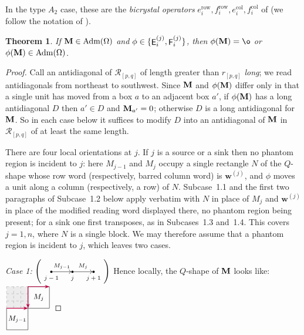 \documentclass[12pt]{amsart}
\newcommand{\bs}{\boldsymbol}
\DeclareMathOperator{\Std}{\operatorname{Adm}}
\DeclareMathOperator{\mate}{\sf E}
\DeclareMathOperator{\matf}{\sf F}
\newcommand{\cell}{.28}
\newcommand{\phantomtile}[5]{%
\begin{scope}[shift={(#1,#2)}]
  \fill[gray!15] (0,0) rectangle ({#3*\cell},{#4*\cell});
  \draw[gray!70, dashed, step=\cell] (0,0) grid ({#3*\cell},{#4*\cell});
  #5
\end{scope}
}
\newtheorem{theorem}{Theorem}[section]
\theoremstyle{definition}
\theoremstyle{remark}
\begin{document}
In the type $A_2$ case, these are the \emph{bicrystal operators} $e_i^{\operatorname{row}}, f_i^{\operatorname{row}},
e_i^{\operatorname{col}}, f_i^{\operatorname{col}}$ of
\cite{Danilov, van} (we follow the notation of \cite{AAA}).

\begin{theorem}\label{thm:S6.3}
If ${\bf M}\in\Std(\Omega)$ and
$\phi\in\{\mate_i^{(j)},\matf_i^{(j)}\}$, then $\phi({\bf M})=\o$ or $\phi({\bf M})\in \operatorname{Adm}(\Omega)$.
\end{theorem}
\begin{proof}
Call an antidiagonal of ${\mathcal R}_{[p,q]}$ of length greater than $r_{[p,q]}$
\emph{long}; we read antidiagonals from northeast to southwest. Since ${\bf M}$ and
$\phi({\bf M})$ differ only in that a single unit has moved from a box $a$ to an adjacent
box $a'$, if $\phi({\bf M})$ has a long antidiagonal $D$ then $a'\in D$ and
${\bf M}_{a'}=0$; otherwise $D$ is a long antidiagonal for ${\bf M}$. So in each case below it suffices to
modify $D$ into an antidiagonal of ${\bf M}$ in ${\mathcal R}_{[p,q]}$ of at least the same
length.

There are four local orientations at $j$. If $j$ is a source or a sink then no phantom
region is incident to $j$: here $M_{j-1}$ and $M_j$ occupy a single rectangle $N$ of the
$Q$-shape whose row word (respectively, barred column word) is ${\bs w}^{(j)}$, and $\phi$
moves a unit along a column (respectively, a row) of $N$. Subcase~1.1 and the first two
paragraphs of Subcase~1.2 below apply verbatim with $N$ in place of $M_j$ and ${\bs w}^{(j)}$ in place of the modified reading word displayed there, no phantom region being present;
for a sink one first transposes, as in Subcases~1.3 and~1.4. This
covers $j=1,n$, where $N$ is a single block. We may therefore assume that a phantom region
is incident to $j$, which leaves two cases.

\noindent\emph{Case 1:} $\left(
\begin{tikzpicture}[baseline=-0.5ex]
\node[circle,fill,inner sep=1pt,label=below:{\scriptsize $j-1$}] (a) at (0,0) {};
\node[circle,fill,inner sep=1pt,label=below:{\scriptsize $j$}]   (b) at (.9,0) {};
\node[circle,fill,inner sep=1pt,label=below:{\scriptsize $j+1$}] (c) at (1.8,0) {};
\draw[->] (a) -- node[above,font=\scriptsize] {$M_{j-1}$} (b);
\draw[->] (b) -- node[above,font=\scriptsize] {$M_j$} (c);
\end{tikzpicture}\right)$ Hence locally, the $Q$-shape of ${\bf M}$ looks like:
$\vcenter{\hbox{\begin{tikzpicture}[scale=1.1, baseline=-.5ex]
\draw (0,0) rectangle (.84,.84);
\node at (.42,.42) {\small{$M_{j-1}$}};
{\phantomtile{0}{.84}{3}{3}{}}
\draw (.84,.84) rectangle (1.68,1.68);
\node at (1.26,1.26) {\small{$M_j$}};
\draw[purple, -{Stealth[length=2mm,width=1.5mm]}, thick] (0,.84) -- (.84,.84);
\draw[purple, -{Stealth[length=2mm,width=1.5mm]}, thick] (.84,1.68) -- (.84,.84);
\draw[purple, -{Stealth[length=2mm,width=1.5mm]}, thick] (.84,1.68) -- (1.68,1.68);
\end{tikzpicture}}}$


\end{proof}
\end{document}
